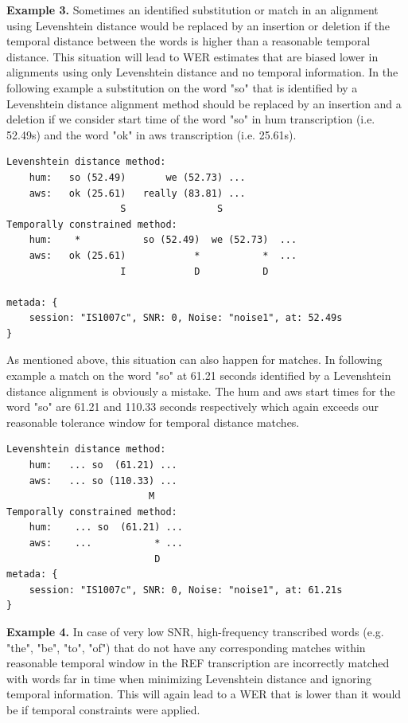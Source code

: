 \documentclass{article}
\begin{document}
\textbf{Example 3.} Sometimes an identified substitution or match in an alignment using Levenshtein distance would be replaced by an insertion or deletion if the temporal distance between the words is higher than a reasonable temporal distance. This situation will lead to WER estimates that are biased lower in alignments using only Levenshtein distance and no temporal information. In the following example a substitution on the word "so" that is identified by a Levenshtein distance alignment method should be replaced by an insertion and a deletion if we consider start time of the word "so" in hum transcription (i.e. 52.49s) and the word "ok" in aws transcription (i.e. 25.61s). 
\begin{verbatim}
Levenshtein distance method:
    hum:   so (52.49)       we (52.73) ...
    aws:   ok (25.61)   really (83.81) ...
                    S                S     
Temporally constrained method:
    hum:    *           so (52.49)  we (52.73)  ...
    aws:   ok (25.61)            *           *  ...
                    I            D           D 

metada: {
    session: "IS1007c", SNR: 0, Noise: "noise1", at: 52.49s
}
\end{verbatim}

As mentioned above, this situation can also happen for matches. In following example a match on the word "so" at 61.21 seconds identified by a Levenshtein distance alignment is obviously a mistake. The hum and aws start times for the word "so" are 61.21 and 110.33 seconds respectively which again exceeds our reasonable tolerance window for temporal distance matches. 

\begin{verbatim}
Levenshtein distance method:
    hum:   ... so  (61.21) ...
    aws:   ... so (110.33) ...
                         M 
Temporally constrained method:
    hum:    ... so  (61.21) ...
    aws:    ...           * ...
                          D  
metada: {
    session: "IS1007c", SNR: 0, Noise: "noise1", at: 61.21s
}
\end{verbatim}

\textbf{Example 4.} In case of very low SNR, high-frequency transcribed words (e.g. "the", "be", "to", "of") that do not have any corresponding matches within reasonable temporal window in the REF transcription are incorrectly matched with words far in time when minimizing Levenshtein distance and ignoring temporal information. This will again lead to a WER that is lower than it would be if temporal constraints were applied. 
\end{document}
